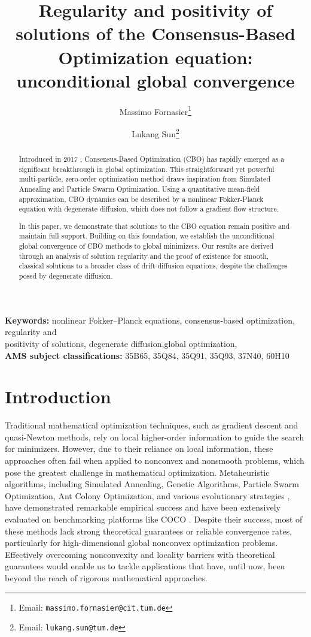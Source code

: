 \documentclass[a4paper, 11pt]{article}
\title{
	Regularity and positivity of solutions of the Consensus-Based Optimization equation: unconditional global convergence
}
\author[1,2,3]{Massimo Fornasier\thanks{Email: \texttt{massimo.fornasier@cit.tum.de} }}
\author[1]{Lukang Sun\thanks{Email: \texttt{lukang.sun@tum.de} }}
\affil[1]{Technical University of Munich, School of Computation, Information and Technology, Department of Mathematics, Munich, Germany}
\affil[2]{Munich Center for Machine Learning, Munich, Germany}
\affil[3]{Munich Data Science Institute, Germany}
\newcounter{results}[section]
\theoremstyle{plain}
\theoremstyle{remark}
\theoremstyle{definition}
\begin{document}
	\maketitle
	\begin{abstract} 
Introduced in 2017 \cite{B1-pinnau2017consensus}, Consensus-Based Optimization (CBO) has rapidly emerged as a significant breakthrough in global optimization. This straightforward yet powerful multi-particle, zero-order optimization method draws inspiration from Simulated Annealing and Particle Swarm Optimization. Using a quantitative mean-field approximation, CBO dynamics can be described by a nonlinear Fokker-Planck equation with degenerate diffusion, which does not follow a gradient flow structure.  

In this paper, we demonstrate that solutions to the CBO equation remain positive and maintain full support. Building on this foundation, we establish the { unconditional} global convergence of CBO methods to global minimizers. Our results are derived through an analysis of solution regularity and the proof of existence for smooth, classical solutions to a broader class of drift-diffusion equations, despite the challenges posed by degenerate diffusion.
	\end{abstract}
	
	
	
	{\noindent\small{\textbf{Keywords:} nonlinear Fokker--Planck equations,  consensus-based optimization, regularity and \\positivity of solutions,	degenerate diffusion,global optimization,
			}}\\
	
	{\noindent\small{\textbf{AMS subject classifications:} 35B65, 35Q84, 35Q91, 35Q93, 37N40, 60H10}}
	\tableofcontents
	
	
	\section{Introduction}


    
Traditional mathematical optimization techniques, such as gradient descent and quasi-Newton methods, rely on local higher-order information to guide the search for minimizers. However, due to their reliance on local information, these approaches often fail when applied to nonconvex and nonsmooth problems, which pose the greatest challenge in mathematical optimization.
Metaheuristic algorithms, including Simulated Annealing, Genetic Algorithms, Particle Swarm Optimization, Ant Colony Optimization, and various evolutionary strategies \cite{GendPotv13,blum2003metaheuristics}, have demonstrated remarkable empirical success and have been extensively evaluated on benchmarking platforms like COCO \cite{COCO21}. Despite their success, most of these methods lack strong theoretical guarantees or reliable convergence rates, particularly for high-dimensional global nonconvex optimization problems. Effectively overcoming nonconvexity and locality barriers with theoretical guarantees would enable us to tackle applications that have, until now, been beyond the reach of { rigorous} mathematical approaches.
\end{document}
